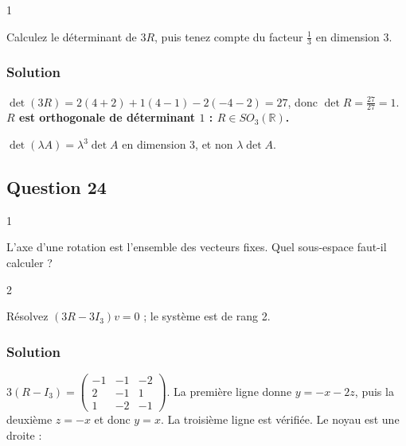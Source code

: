 \documentclass[11pt,a4paper]{article}
\begin{document}
\begin{indication}{1}

Calculez le déterminant de \(3R\), puis tenez compte du facteur \(\frac13\) en dimension 3.

\end{indication}

\hypertarget{solution-22}{%
\subsubsection{Solution}\label{solution-22}}

\(\det(3R)=2(4+2)+1(4-1)-2(-4-2)=27\), donc \(\det R=\frac{27}{27}=1\). \textbf{\(R\) est orthogonale de déterminant \(1\) : \(R\in SO_3(\mathbb{R})\).}

\begin{piege}

\(\det(\lambda A)=\lambda^3\det A\) en dimension 3, et non \(\lambda\det A\).

\end{piege}

\hypertarget{question-24}{%
\subsection{Question 24}\label{question-24}}

\begin{indication}{1}

L'axe d'une rotation est l'ensemble des vecteurs fixes. Quel sous-espace faut-il calculer ?

\end{indication}

\begin{indication}{2}

Résolvez \((3R-3I_3)v=0\) ; le système est de rang 2.

\end{indication}

\hypertarget{solution-23}{%
\subsubsection{Solution}\label{solution-23}}

\(3(R-I_3)=\begin{pmatrix}-1&-1&-2\\2&-1&1\\1&-2&-1\end{pmatrix}\). La première ligne donne \(y=-x-2z\), puis la deuxième \(z=-x\) et donc \(y=x\). La troisième ligne est vérifiée. Le noyau est une droite :
\end{document}
